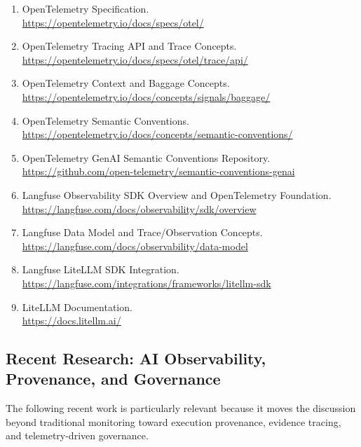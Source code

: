 \documentclass[11pt,a4paper]{article}
\begin{document}
\begin{enumerate}
\item OpenTelemetry Specification.\\
\url{https://opentelemetry.io/docs/specs/otel/}

\item OpenTelemetry Tracing API and Trace Concepts.\\
\url{https://opentelemetry.io/docs/specs/otel/trace/api/}

\item OpenTelemetry Context and Baggage Concepts.\\
\url{https://opentelemetry.io/docs/concepts/signals/baggage/}

\item OpenTelemetry Semantic Conventions.\\
\url{https://opentelemetry.io/docs/concepts/semantic-conventions/}

\item OpenTelemetry GenAI Semantic Conventions Repository.\\
\url{https://github.com/open-telemetry/semantic-conventions-genai}

\item Langfuse Observability SDK Overview and OpenTelemetry Foundation.\\
\url{https://langfuse.com/docs/observability/sdk/overview}

\item Langfuse Data Model and Trace/Observation Concepts.\\
\url{https://langfuse.com/docs/observability/data-model}

\item Langfuse LiteLLM SDK Integration.\\
\url{https://langfuse.com/integrations/frameworks/litellm-sdk}

\item LiteLLM Documentation.\\
\url{https://docs.litellm.ai/}

\end{enumerate}

\subsection*{Recent Research: AI Observability, Provenance, and Governance}

The following recent work is particularly relevant because it moves the discussion beyond traditional monitoring toward execution provenance, evidence tracing, and telemetry-driven governance.
\end{document}
